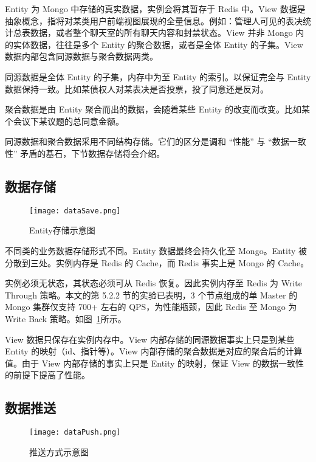 Entity 为 Mongo 中存储的真实数据，实例会将其暂存于 Redis 中。View 数据是抽象概念，指将对某类用户前端视图展现的全量信息。例如：管理人可见的表决统计总表数据，或者整个聊天室的所有聊天内容和封禁状态。View 并非 Mongo 内的实体数据，往往是多个 Entity 的聚合数据，或者是全体 Entity 的子集。View 数据内部包含同源数据与聚合数据两类。

同源数据是全体 Entity 的子集，内存中为至 Entity 的索引。以保证完全与 Entity 数据保持一致。比如某债权人对某表决是否投票，投了同意还是反对。

聚合数据是由 Entity 聚合而出的数据，会随着某些 Entity 的改变而改变。比如某个会议下某议题的总同意金额。

同源数据和聚合数据采用不同结构存储。它们的区分是调和 “性能” 与 “数据一致性” 矛盾的基石，下节数据存储将会介绍。

\subsection{数据存储}

\begin{figure}[!htp]
  \centering
  \texttt{[image: dataSave.png]}
  \caption[Entity存储示意]
    {Entity存储示意图}
 \label{fig:dataSave}
\end{figure}

不同类的业务数据存储形式不同。Entity 数据最终会持久化至 Mongo。Entity 被分散到三处。实例内存是 Redis 的 Cache，而 Redis 事实上是 Mongo 的 Cache。

实例必须无状态，其状态必须可从 Redis 恢复。因此实例内存至 Redis 为 Write Through 策略。本文的第 5.2.2 节的实验已表明，3 个节点组成的单 Master 的 Mongo 集群仅支持 700+ 左右的 QPS，为性能瓶颈，因此 Redis 至 Mongo 为 Write Back 策略。如图~\ref{fig:dataSave}所示。

View 数据只保存在实例内存中。View 内部存储的同源数据事实上只是到某些 Entity 的映射（id、指针等）。View 内部存储的聚合数据是对应的聚合后的计算值。由于 View 内部存储的事实上只是 Entity 的映射，保证 View 的数据一致性的前提下提高了性能。

\subsection{数据推送}

\begin{figure}[!htp]
  \centering
  \texttt{[image: dataPush.png]}
  \caption[推送方式]
    {推送方式示意图}
 \label{fig:dataPush}
\end{figure}


